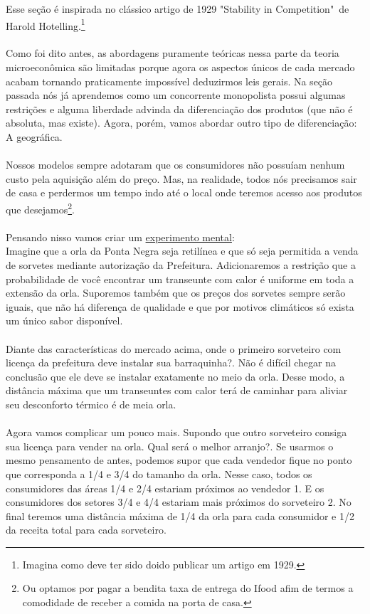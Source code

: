 \documentclass[a4paper,11pt,oneside]{book}
\theoremstyle{definition}
\theoremstyle{break}
\begin{document}
Esse seção é inspirada no clássico artigo de 1929 "Stability in Competition"\ de Harold Hotelling.\footnote{Imagina como deve ter sido doido publicar um artigo em 1929.}
\\
\\
Como foi dito antes, as abordagens puramente teóricas nessa parte da teoria microeconômica são limitadas porque agora os aspectos únicos de cada mercado acabam tornando praticamente impossível deduzirmos leis gerais. Na seção passada nós já aprendemos como um concorrente monopolista possui algumas restrições e alguma liberdade advinda da diferenciação dos produtos (que não é absoluta, mas existe). Agora, porém, vamos abordar outro tipo de diferenciação: A geográfica.
\\
\\
Nossos modelos sempre adotaram que os consumidores não possuíam nenhum custo pela aquisição além do preço. Mas, na realidade, todos nós precisamos sair de casa e perdermos um tempo indo até o local onde teremos acesso aos produtos que desejamos\footnote{Ou optamos por pagar a bendita taxa de entrega do Ifood afim de termos a comodidade de receber a comida na porta de casa.}.
\\
\\
Pensando nisso vamos criar um \href{https://en.wikipedia.org/wiki/Thought_experiment}{experimento mental}:
\\
Imagine que a orla da Ponta Negra seja retilínea e que só seja permitida a venda de sorvetes mediante autorização da Prefeitura. Adicionaremos a restrição que a probabilidade de você encontrar um transeunte com calor é uniforme em toda a extensão da orla. Suporemos também que os preços dos sorvetes sempre serão iguais, que não há diferença de qualidade e que por motivos climáticos só exista um único sabor disponível.
\\
\\
Diante das características do mercado acima, onde o primeiro sorveteiro com licença da prefeitura deve instalar sua barraquinha?. Não é difícil chegar na conclusão que ele deve se instalar exatamente no meio da orla. Desse modo, a distância máxima que um transeuntes com calor terá de caminhar para aliviar seu desconforto térmico é de meia orla.
\\
\\
Agora vamos complicar um pouco mais. Supondo que outro sorveteiro consiga sua licença para vender na orla. Qual será o melhor arranjo?. Se usarmos o mesmo pensamento de antes, podemos supor que cada vendedor fique no ponto que corresponda a 1/4 e 3/4 do tamanho da orla. Nesse caso, todos os consumidores das áreas 1/4 e 2/4 estariam próximos ao vendedor 1. E os consumidores dos setores 3/4 e 4/4 estariam mais próximos do sorveteiro 2. No final teremos uma distância máxima de 1/4 da orla para cada consumidor e 1/2 da receita total para cada sorveteiro.
\end{document}
